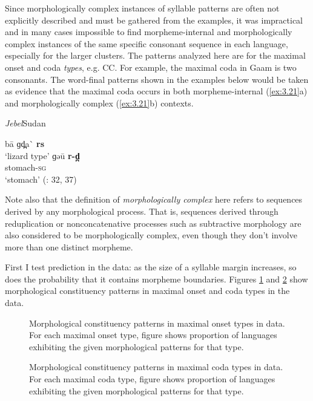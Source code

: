   Since morphologically complex instances of syllable patterns are often not explicitly described and must be gathered from the examples, it was impractical and in many cases impossible to find morpheme-internal and morphologically complex instances of the same specific consonant sequence in each language, especially for the larger clusters. The patterns analyzed here are for the maximal onset and coda \textit{types}, e.g. CC. For example, the maximal coda in Gaam is two consonants. The word-final patterns shown in the examples below would be taken as evidence that the maximal coda occurs in both morpheme-internal (\ref{ex:3.21}a) and morphologically complex (\ref{ex:3.21}b) contexts.

\ea\label{ex:3.21}
 \textit{Jebel}{Sudan}

\ea  ba\={} ɡd̪a\`{} \textbf{rs}\\
\glt ‘lizard type’
\ex  ɡəu\={} \textbf{r-d̪}\\
stomach-\textsc{sg}\\
\glt ‘stomach’
(\citealt{Stirtz2011}: 32, 37)
\z
\z

  Note also that the definition of \textit{morphologically complex} here refers to sequences derived by any morphological process. That is, sequences derived through reduplication or nonconcatenative processes such as subtractive morphology are also considered to be morphologically complex, even though they don’t involve more than one distinct morpheme.

  First I test  prediction in the data: as the size of a syllable margin increases, so does the probability that it contains morpheme boundaries. Figures \ref{fig:3.3} and \ref{fig:3.4} show morphological constituency patterns in maximal onset and coda types in the data.

  
\begin{figure}
\caption{\label{fig:3.3} Morphological constituency patterns in maximal onset types in data. For each maximal onset type, figure shows proportion of languages exhibiting the given morphological patterns for that type.}
\end{figure}


\begin{figure}
\caption{\label{fig:3.4} Morphological constituency patterns in maximal coda types in data. For each maximal coda type, figure shows proportion of languages exhibiting the given morphological patterns for that type.}
\end{figure}

